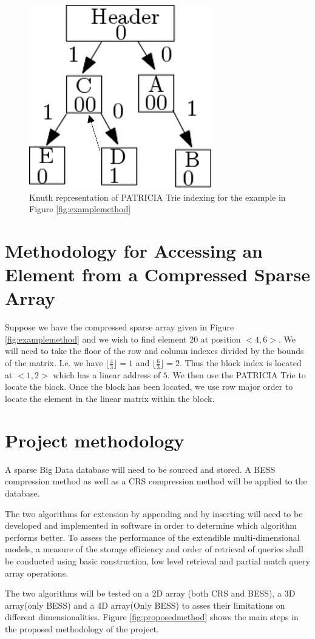  \begin{figure}[H]
 	\centering
 	\includegraphics[width=0.25\linewidth]{knuth1}
 	\caption{Knuth representation of PATRICIA Trie indexing for the example in Figure \ref{fig:examplemethod}}
 	\label{fig:knuth}
 \end{figure}
 
 \section{Methodology for Accessing an Element from a Compressed Sparse Array}
 Suppose we have the compressed sparse array given in Figure \ref{fig:examplemethod} and we wish to find element 20 at position $<4,6>$. We will need to take the floor of the row and column indexes divided by the bounds of the matrix. I.e. we have $ \lfloor\frac{4}{3}\rfloor = 1$ and $\lfloor\frac{6}{3}\rfloor = 2$. Thus the block index is located at $<1,2>$ which has a linear address of $5$. We then use the PATRICIA Trie to locate the block. Once the block has been located, we use row major order to locate the element in the linear matrix within the block.
 
 \section{Project methodology}
 A sparse Big Data database will need to be sourced and stored. A BESS compression method as well as a CRS compression method will be applied to the database.
  
 The two algorithms for extension by appending and by inserting will need to be developed and implemented in software in order to determine which algorithm performs better. To assess the performance of the extendible multi-dimensional models, a measure of the storage efficiency and order of retrieval of queries shall be conducted using basic construction, low level retrieval and partial match query array operations.
 
 The two algorithms will be tested on a 2D array (both CRS and BESS), a 3D array(only BESS) and a 4D array(Only BESS) to asses their limitations on different dimensionalities. Figure \ref{fig:proposedmethod} shows the main steps in the proposed methodology of the project.
 
